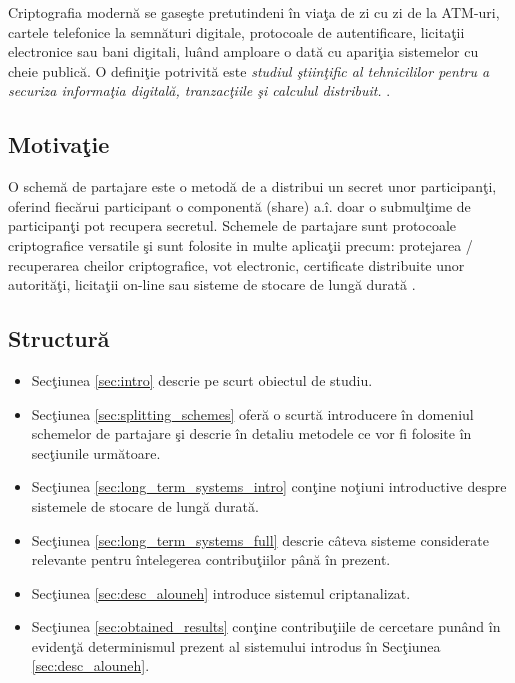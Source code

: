 \documentclass{llncs}
\begin{document}
Criptografia modern\u{a} se gase\c{s}te pretutindeni \^{i}n via\c{t}a de zi cu zi de la ATM-uri, cartele telefonice la semn\u{a}turi digitale, protocoale de autentificare, licita\c{t}ii electronice sau bani digitali, lu\^{a}nd amploare o dat\u{a} cu apari\c{t}ia sistemelor cu cheie public\u{a}. O defini\c{t}ie potrivit\u{a} este \textit{studiul \c{s}tiin\c{t}ific al tehnicililor pentru a securiza informa\c{t}ia digital\u{a}, tranzac\c{t}iile \c{s}i calculul distribuit.} \cite{Katz:2007}.

\subsection{Motiva\c{t}ie}

O schem\u{a} de partajare este o metod\u{a} de a distribui un secret unor participan\c{t}i, oferind fiec\u{a}rui participant o component\u{a} (share) a.\^{i}. doar o submul\c{t}ime de participan\c{t}i pot recupera secretul. Schemele de partajare sunt protocoale criptografice versatile \c{s}i sunt folosite in multe aplica\c{t}ii precum: protejarea / recuperarea cheilor criptografice, vot electronic, certificate distribuite unor autorit\u{a}\c{t}i, licita\c{t}ii on-line sau sisteme de stocare de lung\u{a} durat\u{a} \cite{Martin:2008}.


\subsection{Structur\u{a}}
\begin{itemize}
	\item Sec\c{t}iunea {\ref{sec:intro}} descrie pe scurt obiectul de studiu.
	\item Sec\c{t}iunea {\ref{sec:splitting_schemes}} ofer\u{a} o scurt\u{a} introducere \^{i}n domeniul schemelor de partajare \c{s}i descrie \^{i}n detaliu metodele ce vor fi folosite \^{i}n sec\c{t}iunile urm\u{a}toare.
	\item Sec\c{t}iunea {\ref{sec:long_term_systems_intro}} con\c{t}ine no\c{t}iuni introductive despre sistemele de stocare de lung\u{a} durat\u{a}.
	\item Sec\c{t}iunea {\ref{sec:long_term_systems_full}} descrie c\^{a}teva sisteme considerate relevante pentru \^{i}ntelegerea contribu\c{t}iilor p\^{a}n\u{a} \^{i}n prezent.
	\item Sec\c{t}iunea {\ref{sec:desc_alouneh}} introduce sistemul criptanalizat.
	\item Sec\c{t}iunea {\ref{sec:obtained_results}} con\c{t}ine contribu\c{t}iile de cercetare pun\^{a}nd \^{i}n eviden\c{t}\u{a} determinismul prezent al sistemului introdus \^{i}n Sec\c{t}iunea {\ref{sec:desc_alouneh}}.
\end{itemize}
\end{document}
